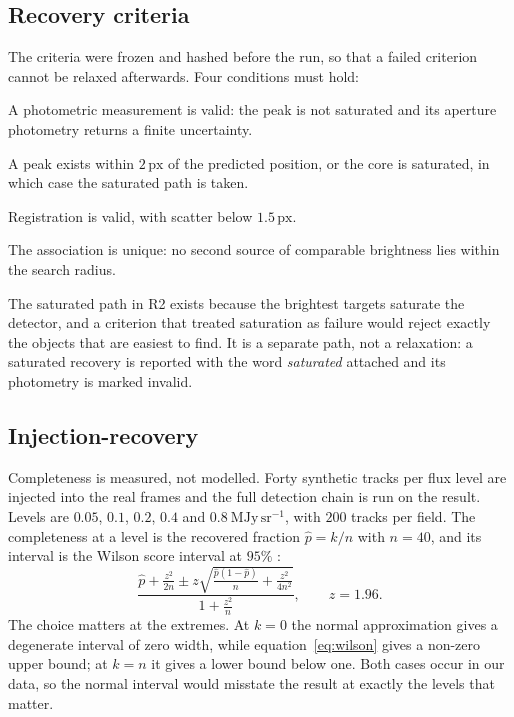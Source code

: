 \documentclass[11pt,a4paper]{article}
\newcommand{\unit}[1]{\,\mathrm{#1}}
\newcommand{\mjysr}{\ \mathrm{MJy\,sr^{-1}}}
\newcommand{\px}{\unit{px}}
\begin{document}
\subsection{Recovery criteria}\label{sec:criteria}
The criteria were frozen and hashed before the run, so that a failed criterion
cannot be relaxed afterwards. Four conditions must hold:
\begin{description}[leftmargin=1.3em,itemsep=1pt]
\item[R1] A photometric measurement is valid: the peak is not saturated and its
aperture photometry returns a finite uncertainty.
\item[R2] A peak exists within $2\px$ of the predicted position, or the core is
saturated, in which case the saturated path is taken.
\item[R3] Registration is valid, with scatter below $1.5\px$.
\item[R4] The association is unique: no second source of comparable brightness
lies within the search radius.
\end{description}
The saturated path in R2 exists because the brightest targets saturate the
detector, and a criterion that treated saturation as failure would reject exactly
the objects that are easiest to find. It is a separate path, not a relaxation: a
saturated recovery is reported with the word \emph{saturated} attached and its
photometry is marked invalid.

\subsection{Injection-recovery}
Completeness is measured, not modelled. Forty synthetic tracks per flux level are
injected into the real frames and the full detection chain is run on the result.
Levels are $0.05$, $0.1$, $0.2$, $0.4$ and $0.8\mjysr$, with $200$ tracks per
field. The completeness at a level is the recovered fraction $\hat p = k/n$ with
$n=40$, and its interval is the Wilson score interval at $95\%$
\citep{wilson1927}:
\begin{equation}
\frac{\hat p + \frac{z^{2}}{2n} \pm z\sqrt{\frac{\hat p(1-\hat p)}{n} + \frac{z^{2}}{4n^{2}}}}{1 + \frac{z^{2}}{n}},
\qquad z = 1.96 .
\label{eq:wilson}
\end{equation}
The choice matters at the extremes. At $k=0$ the normal approximation gives a
degenerate interval of zero width, while equation~\eqref{eq:wilson} gives a
non-zero upper bound; at $k=n$ it gives a lower bound below one. Both cases occur
in our data, so the normal interval would misstate the result at exactly the
levels that matter.
\end{document}
